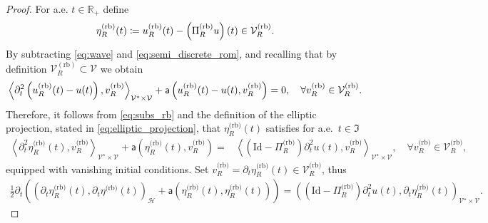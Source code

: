 \documentclass[10pt,a4paper]{amsart}
\newcommand{\IR}{\mathbb{R}}
\newcommand{\IV}{\mathcal{V}}
\newcommand{\cV}{\mathcal{V}}
\newcommand{\cVrb}{\cV^\rb_R}
\newcommand{\dotp}[2]{\left ( #1,#2 \right )}
\newcommand{\dual}[2]{\left \langle #1,#2 \right \rangle}
\newcommand{\rb}{{(\mathrm{rb})}}
\begin{document}
\begin{proof}
For a.e. $t \in \IR_{+}$ define 
\begin{equation}\label{eq:def_eta}
	\eta^{\text{(rb)}}_R(t) 
	\coloneqq 
	u^{\normalfont\text{(rb)}}_R(t)
	   -
	\left(\Pi^{\text{(rb)}}_R u\right)(t)
	\in
	\IV^{\text{(rb)}}_R.
\end{equation} 
By subtracting \eqref{eq:wave} and \eqref{eq:semi_discrete_rom},
and recalling that by definition $\cVrb\subset\cV$ we obtain
\begin{equation}\label{eq:subs_rb}
	\dual{
		\partial^2_t
		\left(
			u^{\normalfont\text{(rb)}}_R(t)
			-
			u(t)
		\right)
	}{
		v^{\text{(rb)}}_R
	}_{\mathcal{V}^\star\times \mathcal{V}}	
	+
	\mathsf{a}
	\dotp{
		u^{\normalfont\text{(rb)}}_R(t)
		-
		u(t)
	}{
		v^{\text{(rb)}}_R
	}
	=
	0,
    \quad
    \forall v^{\text{(rb)}}_R\in \IV^{\text{(rb)}}_R.
\end{equation}
Therefore, it follows from \eqref{eq:subs_rb} and the definition
of the elliptic projection, stated in \eqref{eq:elliptic_projection}, that
$\eta^{\text{(rb)}}_R(t)$ satisfies
for a.e.~$t \in \mathfrak{I}$
\begin{equation}\label{eq:residual_eta}
\begin{aligned}
	\dual{	
		\partial^2_t
		\eta^{\text{(rb)}}_R(t)
	}{
		v^{\text{(rb)}}_R
	}_{\mathcal{V}^\star\times \mathcal{V}}	
    +
	\mathsf{a}
	\dotp{
		\eta^{\text{(rb)}}_R(t)
	}{
		v^{\text{(rb)}}_R
	}
	=
   	&
	\dual{
		\left(
			\text{Id}
			-
			\Pi^{\text{(rb)}}_R
		\right)
		\partial^2_t
		 u(t) 
	}{
		v^{\text{(rb)}}_R
	}_{\mathcal{V}^\star\times \mathcal{V}}	,	
    \quad
    \forall v^{\text{(rb)}}_R \in \IV^{\text{(rb)}}_R,
\end{aligned}
\end{equation}
equipped with vanishing initial conditions.
Set $v^{\text{(rb)}}_R = \partial_t \eta^{\text{(rb)}}_R(t) \in  \IV^{\text{(rb)}}_R$, thus
\begin{equation}
\begin{aligned}
    \frac{1}{2}
    \partial_t
    \left(
    	\dotp{	
    		\partial_t
    		\eta^{\text{(rb)}}_R(t)
    	}{
    	   \partial_t 
           \eta^{\text{(rb)}}(t)
    	}_{\mathcal{H}}
        +
        \mathsf{a}
        \dotp{
            \eta^{\text{(rb)}}_R(t)
        }{
            \eta^{\text{(rb)}}_R(t)
        }
    \right)
    =
    \dotp{
		\left(
			\text{Id}
			-
			\Pi^{\text{(rb)}}_R
		\right)
		\partial^2_t
		 u(t) 
	}{
		\partial_t \eta^{\text{(rb)}}_R(t)
	}_{\mathcal{V}^\star\times \mathcal{V}}.
\end{aligned}

\end{equation}
\end{proof}
\end{document}
